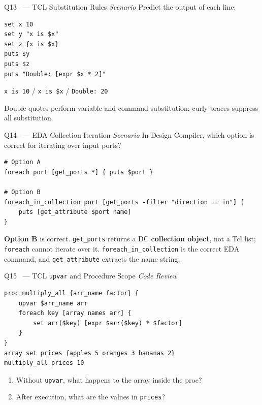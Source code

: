 \documentclass[12pt,a4paper]{article}
\newcommand{\advanced}{%
  \fbox{\textcolor{advred}{\bfseries\sffamily\small ADVANCED}}}
\newcommand{\moderate}{%
  \fbox{\textcolor{modoran}{\bfseries\sffamily\small MODERATE}}}
\begin{document}
\begin{questionbox}{Q13 \moderate\ --- TCL Substitution Rules \hfill\textit{Scenario}}
Predict the output of each line:
\begin{lstlisting}[style=tclstyle]
set x 10
set y "x is $x"
set z {x is $x}
puts $y
puts $z
puts "Double: [expr $x * 2]"
\end{lstlisting}
\end{questionbox}

\begin{answerbox}
\texttt{x is 10} \quad / \quad \texttt{x is \$x} \quad / \quad \texttt{Double: 20}

Double quotes perform variable and command substitution; curly braces suppress all substitution.
\end{answerbox}

\begin{questionbox}{Q14 \advanced\ --- EDA Collection Iteration \hfill\textit{Scenario}}
In Design Compiler, which option is correct for iterating over input ports?

\begin{lstlisting}[style=tclstyle]
# Option A
foreach port [get_ports *] { puts $port }

# Option B
foreach_in_collection port [get_ports -filter "direction == in"] {
    puts [get_attribute $port name]
}
\end{lstlisting}
\end{questionbox}

\begin{answerbox}
\textbf{Option B} is correct. \texttt{get\_ports} returns a DC \textbf{collection object}, not a Tcl list; \texttt{foreach} cannot iterate over it. \texttt{foreach\_in\_collection} is the correct EDA command, and \texttt{get\_attribute} extracts the name string.
\end{answerbox}

\begin{questionbox}{Q15 \advanced\ --- TCL \texttt{upvar} and Procedure Scope \hfill\textit{Code Review}}

\begin{lstlisting}[style=tclstyle]
proc multiply_all {arr_name factor} {
    upvar $arr_name arr
    foreach key [array names arr] {
        set arr($key) [expr $arr($key) * $factor]
    }
}
array set prices {apples 5 oranges 3 bananas 2}
multiply_all prices 10
\end{lstlisting}

\begin{enumerate}[label=\textbf{\alph*)}]
  \item Without \texttt{upvar}, what happens to the array inside the proc?
  \item After execution, what are the values in \texttt{prices}?
\end{enumerate}
\end{questionbox}
\end{document}
